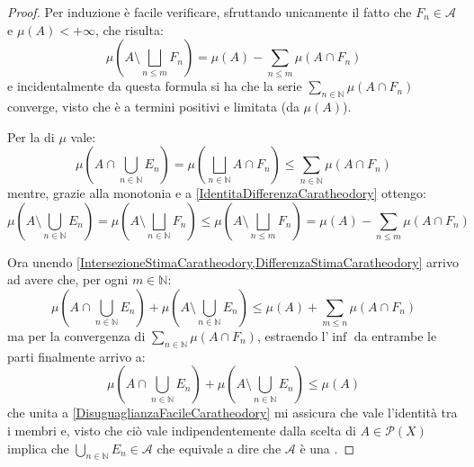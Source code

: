 \begin{proof}
	Per induzione è facile verificare, sfruttando unicamente il fatto che $F_n\in\mathcal A$ e $\mu(A)<+\infty$, che risulta:
	\begin{equation}\label{IdentitaDifferenzaCaratheodory}
		\mu\left(A\setminus \bigsqcup_{n\le m} F_n\right)=\mu(A)-\sum_{n\le m} \mu(A\cap F_n)
	\end{equation}
	e incidentalmente da questa formula si ha che la serie $\sum_{n\in\mathbb N}\mu(A\cap F_n)$ converge, visto che è a termini positivi e limitata (da $\mu(A)$).
	
	Per la \sigsubadd[ità] di $\mu$ vale:
	\begin{equation}\label{IntersezioneStimaCaratheodory}
		\mu\left(A\cap\bigcup_{n\in\mathbb N} E_n\right)=\mu\left(\bigsqcup_{n\in\mathbb N} A\cap F_n\right)\le
		\sum_{n\in\mathbb N} \mu(A\cap F_n)
	\end{equation}
	mentre, grazie alla monotonia e a \cref{IdentitaDifferenzaCaratheodory} ottengo:
	\begin{equation}\label{DifferenzaStimaCaratheodory}
		\mu\left(A\setminus\bigcup_{n\in\mathbb N} E_n\right) = \mu\left(A\setminus\bigsqcup_{n\in\mathbb N} F_n\right) \le \mu\left(A\setminus\bigsqcup_{n\le m} F_n\right) = 
		\mu(A)-\sum_{n\le m}\mu(A\cap F_n)
	\end{equation}
	
	Ora unendo \cref{IntersezioneStimaCaratheodory,DifferenzaStimaCaratheodory} arrivo ad avere che, per ogni $m\in\mathbb{N}$:
	\begin{equation*}
		\mu\left(A\cap\bigcup_{n\in\mathbb N} E_n\right)+\mu\left(A\setminus\bigcup_{n\in\mathbb N} E_n\right)\le
		\mu(A)+\sum_{m\le n}\mu(A\cap F_n) 
	\end{equation*}
	ma per la convergenza di $\sum_{n\in \mathbb N}\mu(A\cap F_n)$, estraendo l'$\inf$ da entrambe le parti finalmente arrivo a:
	\begin{equation*}
		\mu\left(A\cap\bigcup_{n\in\mathbb N} E_n\right)+\mu\left(A\setminus\bigcup_{n\in\mathbb N} E_n\right)\le
		\mu(A)
	\end{equation*}
	che unita a \cref{DisuguaglianzaFacileCaratheodory} mi assicura che vale l'identità tra i membri e, visto che ciò vale indipendentemente dalla scelta di $A\in\mathcal P(X)$ implica che $\bigcup_{n\in\mathbb N}E_n\in\mathcal A$ che equivale a dire che $\mathcal A$ è una \sigalg{}.
	

\end{proof}
